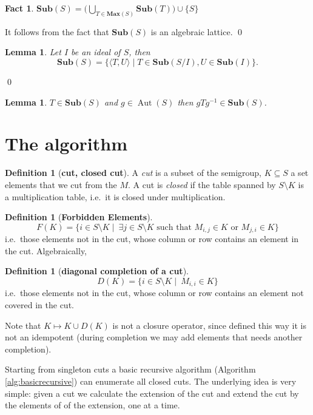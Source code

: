 \documentclass{amsart}
\newcommand{\Sub}{\mathbf{Sub}}
\newcommand{\Max}{\mathbf{Max}}
\DeclareMathOperator{\Aut}{Aut}
\theoremstyle{plain}
\newtheorem{lemma}[theorem]{Lemma}
\newtheorem{fact}[theorem]{Fact}
\theoremstyle{definition}
\newtheorem{definition}[theorem]{Definition}
\begin{document}
\begin{fact}
$\Sub(S)=\big( \bigcup_{T\in \Max(S)}\Sub(T)\big)\cup \{S\}$
\end{fact}
\proof
It follows from the fact that $\Sub(S)$ is an algebraic lattice.
\qed

\begin{lemma}
Let $I$ be an ideal of $S$, then $$\Sub(S)=\big\{\langle T,U \rangle\mid T\in \Sub(S/I), U\in\Sub(I)\big\}.$$
\end{lemma}
\proof

\qed

\begin{lemma}
$T\in\Sub(S)$ and $g\in \Aut(S)$ then $gTg^{-1}\in\Sub(S)$.
\end{lemma}

\section{The algorithm}
\begin{definition}[\textbf{cut, closed cut}]
A \emph{cut} is a subset of the semigroup, $K\subseteq S$ a set elements that we cut from the $M$.  A cut is \emph{closed} if the table spanned by $S\setminus K$ is a multiplication table, i.e.\ it is closed under multiplication.
\end{definition}

\begin{definition}[\textbf{Forbidden Elements}]
$$F(K)=\{i\in S\setminus K \mid\ \exists j\in S\setminus K \text{ such that } M_{i,j}\in K \text{ or } M_{j,i}\in K\} $$
\noindent i.e.\ those elements not in the cut, whose column or row contains an element in the cut.
Algebraically, 
\end{definition}



\begin{definition}[\textbf{diagonal completion of a cut}]
$$D(K)=\{i\in S\setminus K \mid\ M_{i,i}\in K \} $$
\noindent i.e.\ those elements not in the cut, whose column or row contains an element not covered in the cut.
\end{definition}


Note that $K\mapsto K\cup D(K)$ is not a closure operator, since defined this way it is not an idempotent (during completion we may add elements that needs another completion).

 Starting from singleton cuts a basic recursive algorithm (Algorithm \ref{alg:basicrecursive}) can enumerate all closed cuts. The underlying idea is very simple: given a cut we calculate the extension of the cut and extend the cut by the elements of of the extension, one at a time. 
\end{document}
